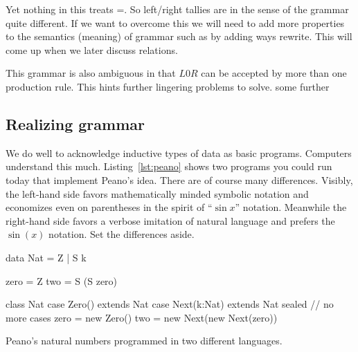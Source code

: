Yet nothing in this treats =.  So left/right 
tallies are in the sense of the grammar quite different.  If we 
want to overcome this we will need to add more properties to the 
semantics (meaning) of grammar such as by adding ways rewrite.
This will come up when we later discuss relations.

This grammar is also ambiguous in that $L0R$ can be accepted by more than one
production rule.  This hints further lingering problems to solve.
some further

\subsection{Realizing grammar}

We do well to acknowledge inductive types of data as basic programs. Computers
understand this much. Listing~\ref{lst:peano} shows two programs you could run
today that implement Peano's idea. There are of course many differences.
Visibly, the left-hand side favors mathematically minded symbolic notation and
economizes even on parentheses in the spirit of ``$\sin x$'' notation. Meanwhile
the right-hand side favors a verbose imitation of natural language and prefers
the $\sin(x)$ notation.  Set the differences aside.

\begin{lstfloat}
\begin{center}
\begin{minipage}{0.34\textwidth}
\begin{Fcode}[]
data Nat = Z 
         | S k

zero = Z
two = S (S zero)
\end{Fcode}
\end{minipage}
\hfill
\begin{minipage}{0.65\textwidth}
\begin{Pcode}[language=Sava]
class Nat
    case Zero() extends Nat
    case Next(k:Nat) extends Nat
sealed  // no more cases
zero = new Zero()
two = new Next(new Next(zero))
\end{Pcode}
\end{minipage}
\end{center}
\caption{Peano's natural numbers programmed in two different languages.}
\label{lst:peano}
\end{lstfloat}
    

